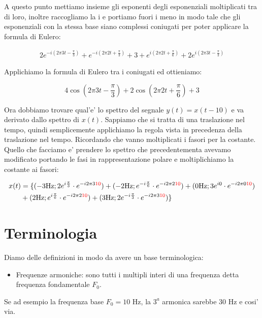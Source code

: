 A questo punto mettiamo insieme gli esponenti degli esponenziali moltiplicati tra di loro, inoltre raccogliamo la i e portiamo fuori i meno in modo tale che gli esponenziali con la stessa base siano complessi coniugati per poter applicare la formula di Eulero:

\[\begin{split}
    2e^{-i(2\pi 3t - \frac{\pi}{3})} + e^{-i(2\pi 2t + \frac{\pi}{3})} + 3 + e^{i(2\pi 2t + \frac{\pi}{6})} + 2e^{i(2\pi 3t - \frac{\pi}{3})}
\end{split}\]

Applichiamo la formula di Eulero tra i coniugati ed ottieniamo:

\[
    4 \cos{(2\pi 3t - \frac{\pi}{3})} + 2 \cos{(2\pi 2t +\frac{\pi}{6})} + 3
\]

Ora dobbiamo trovare qual'e' lo spettro del segnale $y(t) = x(t - 10)$ e va derivato dallo spettro di $x(t)$. Sappiamo che si tratta di una traslazione nel tempo, quindi semplicemente applichiamo la regola vista in precedenza della traslazione nel tempo. Ricordando che vanno moltiplicati i fasori per la costante.
Quello che facciamo e' prendere lo spettro che precedentementa avevamo modificato portando le fasi in rappresentazione polare e moltiplichiamo la costante ai fasori:

\[\begin{split}
    x(t) &=\{ (-3 \mbox{Hz}; 2e^{i \frac{\pi}{3}} \cdot e^{-i2 \pi 3 \textcolor{red}{10}}) + (-2 \mbox{Hz}; e^{-i \frac{\pi}{6}} \cdot e^{-i2 \pi 2 \textcolor{red}{10}}) + (0 \mbox{Hz}; 3e^{i 0} \cdot e^{-i2 \pi 0 \textcolor{red}{10}}) \\
    &+ (2 \mbox{Hz}; e^{i \frac{\pi}{6}} \cdot e^{-i2 \pi 2 \textcolor{red}{10}}) + (3 \mbox{Hz}; 2e^{-i \frac{\pi}{3}} \cdot e^{-i2 \pi 3 \textcolor{red}{10}}) \}
\end{split}\]

\section{Terminologia}
Diamo delle definizioni in modo da avere un base terminologica:
\begin{itemize}
    \item Frequenze armoniche: sono tutti i multipli interi di una frequenza detta frequenza fondamentale $F_0$.
\end{itemize}

Se ad esempio la frequenza base $F_0 = 10$ Hz, la $3^a$ armonica sarebbe 30 Hz e cosi' via.

